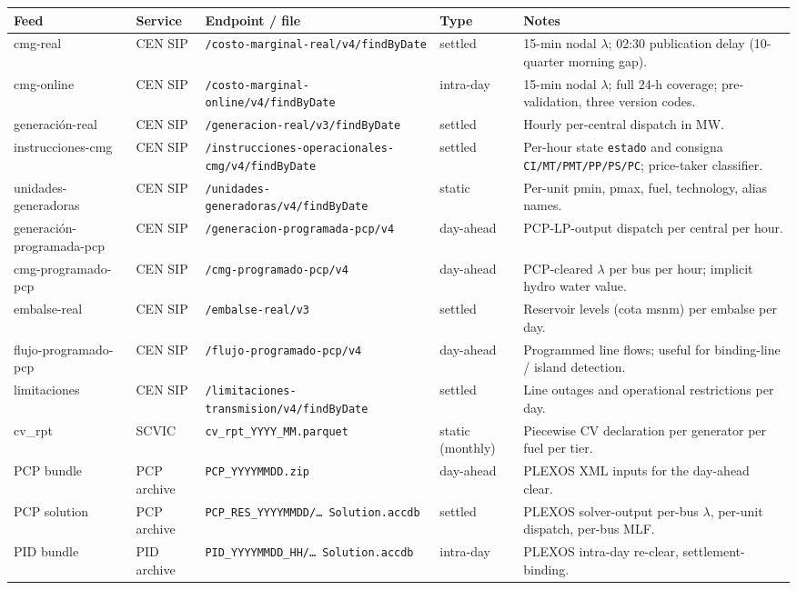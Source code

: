 \begin{tabularx}{\textwidth}{l l l l X}
  \toprule
  Feed & Service & Endpoint / file & Type & Notes \\
  \midrule
  cmg-real          & CEN SIP   & \texttt{/costo-marginal-real/v4/findByDate}     & settled    & 15-min nodal $\lambda$; 02:30 publication delay (10-quarter morning gap). \\
  cmg-online        & CEN SIP   & \texttt{/costo-marginal-online/v4/findByDate}   & intra-day  & 15-min nodal $\lambda$; full 24-h coverage; pre-validation, three version codes. \\
  generaci\'on-real & CEN SIP   & \texttt{/generacion-real/v3/findByDate}         & settled    & Hourly per-central dispatch in MW. \\
  instrucciones-cmg & CEN SIP   & \texttt{/instrucciones-operacionales-cmg/v4/findByDate} & settled & Per-hour state \texttt{estado} and consigna \texttt{CI/MT/PMT/PP/PS/PC}; price-taker classifier. \\
  unidades-generadoras & CEN SIP & \texttt{/unidades-generadoras/v4/findByDate}   & static     & Per-unit pmin, pmax, fuel, technology, alias names. \\
  generaci\'on-programada-pcp & CEN SIP & \texttt{/generacion-programada-pcp/v4} & day-ahead  & PCP-LP-output dispatch per central per hour. \\
  cmg-programado-pcp          & CEN SIP & \texttt{/cmg-programado-pcp/v4}         & day-ahead  & PCP-cleared $\lambda$ per bus per hour; implicit hydro water value. \\
  embalse-real      & CEN SIP   & \texttt{/embalse-real/v3}                       & settled    & Reservoir levels (cota msnm) per embalse per day. \\
  flujo-programado-pcp & CEN SIP & \texttt{/flujo-programado-pcp/v4}             & day-ahead  & Programmed line flows; useful for binding-line / island detection. \\
  limitaciones      & CEN SIP   & \texttt{/limitaciones-transmision/v4/findByDate} & settled & Line outages and operational restrictions per day. \\
  \midrule
  cv\_rpt           & SCVIC     & \texttt{cv\_rpt\_YYYY\_MM.parquet}              & static (monthly) & Piecewise CV declaration per generator per fuel per tier. \\
  \midrule
  PCP bundle        & PCP archive & \texttt{PCP\_YYYYMMDD.zip}                    & day-ahead  & PLEXOS XML inputs for the day-ahead clear. \\
  PCP solution      & PCP archive & \texttt{PCP\_RES\_YYYYMMDD/\dots\,Solution.accdb} & settled & PLEXOS solver-output per-bus $\lambda$, per-unit dispatch, per-bus MLF. \\
  PID bundle        & PID archive & \texttt{PID\_YYYYMMDD\_HH/\dots\,Solution.accdb} & intra-day & PLEXOS intra-day re-clear, settlement-binding. \\
  \bottomrule
\end{tabularx}
